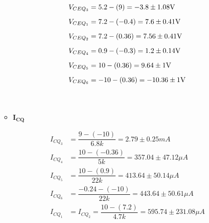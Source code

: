 \begin{enumerate}
\begin{itemize}
                \begin{align*}
                  V_{CEQ_3} & =5.2-(9)=-3.8 \pm 1.08\volt    \\[0.2cm]
                  V_{CEQ_1} & =7.2-(-0.4)=7.6 \pm 0.41\volt  \\[0.2cm]
                  V_{CEQ_2} & =7.2-(0.36)=7.56 \pm 0.41\volt \\[0.2cm]
                  V_{CEQ_4} & =0.9-(-0.3)=1.2 \pm 0.14\volt  \\[0.2cm]
                  V_{CEQ_5} & =10-(0.36)=9.64 \pm 1\volt     \\[0.2cm]
                  V_{CEQ_6} & =-10-(0.36)=-10.36 \pm 1\volt  \\[1cm]
                \end{align*}


          \item $\mathbf{I_{CQ}}$

                \begin{align*}
                  I_{CQ_3} & =\dfrac{9-(-10)}{6.8k}=2.79 \pm 0.25 mA                   \\[0.2cm]
                  I_{CQ_4} & =\dfrac{10-(-0.36)}{5k}=357.04 \pm 47.12\mu A             \\[0.2cm]
                  I_{CQ_5} & =\dfrac{10-(0.9)}{22k}=413.64 \pm 50.14\mu A              \\[0.2cm]
                  I_{CQ_6} & =\dfrac{-0.24-(-10)}{22k}=443.64 \pm 50.61\mu A           \\[0.2cm]
                  I_{CQ_1} & = I_{CQ_2}=\dfrac{10-(7.2)}{4.7k}=595.74 \pm 231.08 \mu A \\[1cm]
                \end{align*}




\end{itemize}
\end{enumerate}
